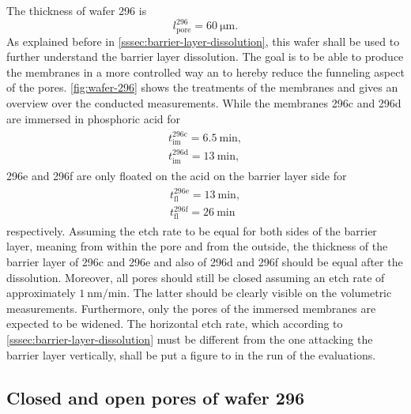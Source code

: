 \documentclass[thesis.tex]{subfiles}
\begin{document}
      The thickness of wafer 296 is
      \begin{equation}
          l^{296}_\mathrm{pore}=\SI{60}{\micro\meter}.
      \end{equation}
      As explained before in \cref{sssec:barrier-layer-dissolution}, this wafer shall be used to further understand the barrier layer dissolution. The goal is to be able to produce the membranes in a more controlled way an to hereby reduce the funneling aspect of the pores. \cref{fig:wafer-296} shows the treatments of the membranes and gives an overview over the conducted measurements. While the membranes 296c and 296d are immersed in phosphoric acid for
      \begin{align}
          \begin{split}
              t^\mathrm{296c}_\mathrm{im}=\SI{6,5}{\minute},    \\
              t^\mathrm{296d}_\mathrm{im}=\SI{13}{\minute},
          \end{split}
          \label{eq:t-immerse}
      \end{align}
      296e and 296f are only floated on the acid on the barrier layer side for
      \begin{align}
          \begin{split}
              t^\mathrm{296e}_\mathrm{fl}=\SI{13}{\minute}, \\
              t^\mathrm{296f}_\mathrm{fl}=\SI{26}{\minute}
          \end{split}
          \label{eq:t-float}
      \end{align}
      respectively. Assuming the etch rate to be equal for both sides of the barrier layer, meaning from within the pore and from the outside, the thickness of the barrier layer of 296c and 296e and also of 296d and 296f should be equal after the dissolution. Moreover, all pores should still be closed assuming an etch rate of approximately $\SI{1}{\nano\meter\per\minute}$. The latter should be clearly visible on the volumetric measurements. Furthermore, only the pores of the immersed membranes are expected to be widened. The horizontal etch rate, which according to \cref{sssec:barrier-layer-dissolution} must be different from the one attacking the barrier layer vertically, shall be put a figure to in the run of the evaluations.

      


      \subsection{Closed and open pores of wafer 296}
      \label{subsec:cp-op-w296}
\end{document}
